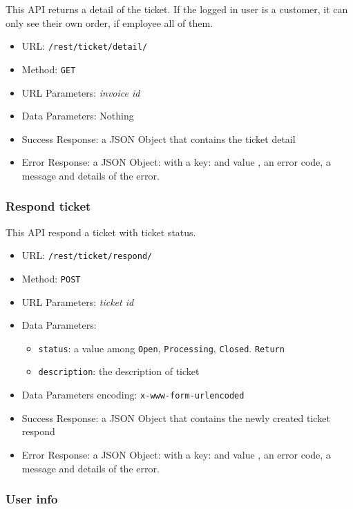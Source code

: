 This API returns a detail of the ticket.
If the logged in user is a customer, it can only see their own order, if employee all of them.

\begin{itemize}
    \item URL: \texttt{/rest/ticket/detail/}
    \item Method: \texttt{GET}
    \item URL Parameters: \textit{invoice id}
    \item Data Parameters: Nothing
    \item Success Response: a JSON Object that contains the ticket detail
    \item Error Response: a JSON Object: with a key:   and value , an error code, a message and details of the error.
\end{itemize}


\subsubsection*{Respond ticket}

This API respond a ticket with ticket status.

\begin{itemize}
    \item URL: \texttt{/rest/ticket/respond/}
    \item Method: \texttt{POST}
    \item URL Parameters: \textit{ticket id}
    \item Data Parameters:
    \begin{itemize}
        \item \texttt{status}: a value among \texttt{Open}, \texttt{Processing}, \texttt{Closed}. \texttt{Return}
        \item \texttt{description}: the description of ticket
    \end{itemize}
    \item Data Parameters encoding: \texttt{x-www-form-urlencoded}
    \item Success Response: a JSON Object that contains the newly created ticket respond
    \item Error Response: a JSON Object: with a key:   and value , an error code, a message and details of the error.
\end{itemize}

\subsubsection*{User info}

